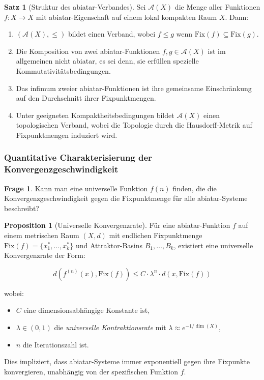 \documentclass[a4paper,12pt]{article}
\theoremstyle{definition}
\newtheorem{satz}{Satz}
\newtheorem{proposition}{Proposition}
\newtheorem{frage}{Frage}
\begin{document}
\begin{satz}[Struktur des abiatar-Verbandes]
Sei $\mathcal{A}(X)$ die Menge aller Funktionen $f: X \to X$ mit abiatar-Eigenschaft auf einem lokal kompakten Raum $X$. Dann:

\begin{enumerate}
\item $({\mathcal{A}(X)}, \leq)$ bildet einen Verband, wobei $f \leq g$ wenn $\text{Fix}(f) \subseteq \text{Fix}(g)$.

\item Die Komposition von zwei abiatar-Funktionen $f, g \in \mathcal{A}(X)$ ist im allgemeinen nicht abiatar, es sei denn, sie erfüllen spezielle Kommutativitätsbedingungen.

\item Das infimum zweier abiatar-Funktionen ist ihre gemeinsame Einschränkung auf den Durchschnitt ihrer Fixpunktmengen.

\item Unter geeigneten Kompaktheitsbedingungen bildet $\mathcal{A}(X)$ einen topologischen Verband, wobei die Topologie durch die Hausdorff-Metrik auf Fixpunktmengen induziert wird.
\end{enumerate}
\end{satz}

\subsubsection{Quantitative Charakterisierung der Konvergenzgeschwindigkeit}

\begin{frage}
Kann man eine universelle Funktion $f(n)$ finden, die die Konvergenzgeschwindigkeit gegen die Fixpunktmenge für alle abiatar-Systeme beschreibt?
\end{frage}

\begin{proposition}[Universelle Konvergenzrate]
Für eine abiatar-Funktion $f$ auf einem metrischen Raum $(X, d)$ mit endlichen Fixpunktmenge $\text{Fix}(f) = \{x_1^*, \ldots, x_k^*\}$ und Attraktor-Basins $B_1, \ldots, B_k$, existiert eine universelle Konvergenzrate der Form:

\begin{equation}
d(f^{(n)}(x), \text{Fix}(f)) \leq C \cdot \lambda^n \cdot d(x, \text{Fix}(f))
\end{equation}

wobei:
\begin{itemize}
	\item $C$ eine dimensionsabhängige Konstante ist,
	\item $\lambda \in (0, 1)$ die \textit{universelle Kontraktionsrate} mit $\lambda \approx e^{-1/\dim(X)}$,
	\item $n$ die Iterationszahl ist.
\end{itemize}

Dies impliziert, dass abiatar-Systeme immer exponentiell gegen ihre Fixpunkte konvergieren, unabhängig von der spezifischen Funktion $f$.
\end{proposition}
\end{document}
